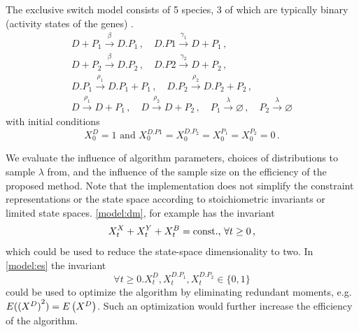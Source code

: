 
\begin{model}\label{model:es}
  The exclusive switch model consists of \num{5} species, \num{3} of
  which are typically binary (activity states of the genes)
  \parencite{loinger2007stochastic}.
  \begin{gather*}
    D + P_1 \xrightarrow{\beta} D.P_1\,,\quad
    D.P1 \xrightarrow{\gamma_1} D + P_1  \,,\\
    D + P_2 \xrightarrow{\beta} D.P_2 \,,\quad
    D.P2 \xrightarrow{\gamma_2} D + P_2 \,,\\
    D.P_1 \xrightarrow{\rho_1} D.P_1 + P_1\,, \quad
    D.P_2 \xrightarrow{\rho_2} D.P_2 + P_2\,,\\
    D \xrightarrow{\rho_1} D + P_1\,,\quad
    D \xrightarrow{\rho_2} D + P_2\,,  \quad
    P_1 \xrightarrow{\lambda}\varnothing  \,,\quad
    P_2\xrightarrow{\lambda} \varnothing
  \end{gather*}
  with initial conditions
  \[X^D_0=1 \text{ and } X^{D.P1}_0=X^{D.{P_2}}_0=X^{P_1}_0=X^{P_2}_0=0\,.\]
\end{model}

We evaluate the influence of algorithm parameters, choices of distributions
to sample $\lambda$ from, and the influence of the sample size on the
efficiency of
the proposed method.
Note that the implementation does not simplify the constraint representations
or the state space according to stoichiometric invariants or limited
state spaces.
\autoref{model:dm}, for example has the invariant
\[
  X^X_t+X^Y_t+X^B_t=\text{const.}$, $\forall t\geq 0\,,
\]
which could be used to reduce the state-space dimensionality to two.
In \autoref{model:es} the invariant
\[
  \forall t\geq 0.X^D_t,X^{D.{P_1}}_t,X^{D.{P_2}}_t\in\{0,1\}
\]
could be used to optimize the algorithm by eliminating redundant
moments, e.g.\ ${E}({(X^D)}^2)={E}\left(X^D\right)$.
Such an optimization would further increase the efficiency of the algorithm.

